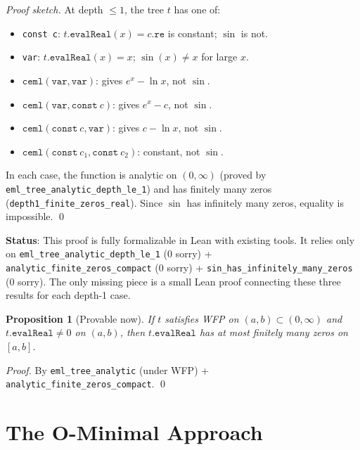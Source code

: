 \documentclass[12pt]{article}
\newtheorem{proposition}[theorem]{Proposition}
\begin{document}
\begin{proof}[Proof sketch]
At depth $\leq 1$, the tree $t$ has one of:
\begin{itemize}[noitemsep]
  \item \texttt{const c}: $t.\mathtt{evalReal}(x) = c.\mathtt{re}$ is constant; $\sin$ is not.
  \item \texttt{var}: $t.\mathtt{evalReal}(x) = x$; $\sin(x) \neq x$ for large $x$.
  \item $\mathtt{ceml}(\mathtt{var}, \mathtt{var})$: gives $e^x - \ln x$, not $\sin$.
  \item $\mathtt{ceml}(\mathtt{var}, \mathtt{const}\ c)$: gives $e^x - c$, not $\sin$.
  \item $\mathtt{ceml}(\mathtt{const}\ c, \mathtt{var})$: gives $c - \ln x$, not $\sin$.
  \item $\mathtt{ceml}(\mathtt{const}\ c_1, \mathtt{const}\ c_2)$: constant, not $\sin$.
\end{itemize}
In each case, the function is analytic on $(0,\infty)$ (proved by
\texttt{eml\_tree\_analytic\_depth\_le\_1}) and has finitely many zeros
(\texttt{depth1\_finite\_zeros\_real}). Since $\sin$ has infinitely many zeros,
equality is impossible. \qed
\end{proof}

\textbf{Status}: This proof is fully formalizable in Lean with existing tools.
It relies only on \texttt{eml\_tree\_analytic\_depth\_le\_1} (0 sorry) +
\texttt{analytic\_finite\_zeros\_compact} (0 sorry) + \texttt{sin\_has\_infinitely\_many\_zeros} (0 sorry).
The only missing piece is a small Lean proof connecting these three results for each depth-1 case.

\begin{proposition}[\textcolor{proved}{Provable now}]\label{prop:wfp}
If $t$ satisfies WFP on $(a,b) \subset (0,\infty)$ and $t.\mathtt{evalReal} \neq 0$
on $(a,b)$, then $t.\mathtt{evalReal}$ has at most finitely many zeros on $[a,b]$.
\end{proposition}

\begin{proof}
By \texttt{eml\_tree\_analytic} (under WFP) + \texttt{analytic\_finite\_zeros\_compact}. \qed
\end{proof}

\section{The O-Minimal Approach}
\end{document}
